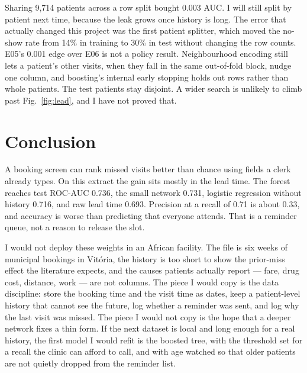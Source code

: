 \documentclass[conference]{IEEEtran}
\begin{document}
Sharing 9,714 patients across a row split bought 0.003 AUC. I will still split by patient next time, because the leak grows once history is long. The error that actually changed this project was the first patient splitter, which moved the no-show rate from 14\% in training to 30\% in test without changing the row counts. E05's 0.001 edge over E06 is not a policy result. Neighbourhood encoding still lets a patient's other visits, when they fall in the same out-of-fold block, nudge one column, and boosting's internal early stopping holds out rows rather than whole patients. The test patients stay disjoint. A wider search is unlikely to climb past Fig.~\ref{fig:lead}, and I have not proved that.

\section{Conclusion}
A booking screen can rank missed visits better than chance using fields a clerk already types. On this extract the gain sits mostly in the lead time. The forest reaches test ROC-AUC 0.736, the small network 0.731, logistic regression without history 0.716, and raw lead time 0.693. Precision at a recall of 0.71 is about 0.33, and accuracy is worse than predicting that everyone attends. That is a reminder queue, not a reason to release the slot.

I would not deploy these weights in an African facility. The file is six weeks of municipal bookings in Vit\'{o}ria, the history is too short to show the prior-miss effect the literature expects, and the causes patients actually report --- fare, drug cost, distance, work --- are not columns. The piece I would copy is the data discipline: store the booking time and the visit time as dates, keep a patient-level history that cannot see the future, log whether a reminder was sent, and log why the last visit was missed. The piece I would not copy is the hope that a deeper network fixes a thin form. If the next dataset is local and long enough for a real history, the first model I would refit is the boosted tree, with the threshold set for a recall the clinic can afford to call, and with age watched so that older patients are not quietly dropped from the reminder list.
\end{document}

